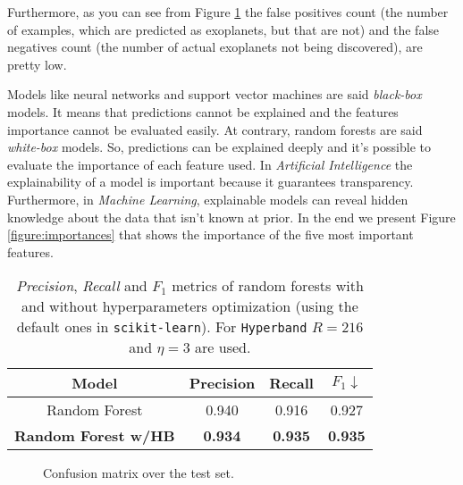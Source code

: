 \documentclass[11pt, a4paper]{article}
\begin{document}
  Furthermore, as you can see from Figure \ref{figure:confusion} the false positives count (the number of examples, which are predicted as exoplanets, but that are not) and the false negatives count (the number of actual exoplanets not being discovered), are pretty low.

  Models like neural networks and support vector machines are said \textit{black-box} models.
  It means that predictions cannot be explained and the features importance cannot be evaluated easily.
  At contrary, random forests are said \textit{white-box} models.
  So, predictions can be explained deeply and it's possible to evaluate the importance of each feature used.
  In \textit{Artificial Intelligence} the explainability of a model is important because it guarantees transparency.
  Furthermore, in \textit{Machine Learning}, explainable models can reveal hidden knowledge about the data that isn't known at prior.
  In the end we present Figure \ref{figure:importances} that shows the importance of the five most important features.

  \begin{table}
    \centering
    \begin{tabular}{|c c c c|}
      \hline
      Model & Precision & Recall & $F_{1} \downarrow$  \\
      \hline\hline
      Random Forest & 0.940 & 0.916 & 0.927 \\
      \hline
      \textbf{Random Forest w/HB} & \textbf{0.934} & \textbf{0.935} & \textbf{0.935} \\
      \hline
    \end{tabular}
    \caption{\textit{Precision}, \textit{Recall} and $F_{1}$ metrics of random forests with and without hyperparameters optimization (using the default ones in \texttt{scikit-learn}). For \texttt{Hyperband} $R=216$ and $\eta=3$ are used.}
    \label{table:benchmark}
  \end{table}

  \begin{figure}
    \centering
    \caption{Confusion matrix over the test set.}
    \label{figure:confusion}
  \end{figure}
\end{document}
